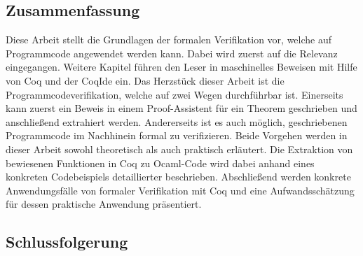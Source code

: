 \subsection{Zusammenfassung}
Diese Arbeit stellt die Grundlagen der formalen Verifikation vor, welche auf Programmcode angewendet werden kann. Dabei wird zuerst auf die Relevanz eingegangen. Weitere Kapitel führen den Leser in maschinelles Beweisen mit Hilfe von Coq und der CoqIde ein. Das Herzstück dieser Arbeit ist die Programmcodeverifikation, welche auf zwei Wegen durchführbar ist. Einerseits kann zuerst ein Beweis in einem Proof-Assistent für ein Theorem geschrieben und anschließend extrahiert werden. Andererseits ist es auch möglich, geschriebenen Programmcode im Nachhinein formal zu verifizieren. Beide Vorgehen werden in dieser Arbeit sowohl theoretisch als auch praktisch erläutert. Die Extraktion von bewiesenen Funktionen in Coq zu Ocaml-Code wird dabei anhand eines konkreten Codebeispiels detaillierter beschrieben. Abschließend werden konkrete Anwendungsfälle von formaler Verifikation mit Coq und eine Aufwandsschätzung für dessen praktische Anwendung präsentiert.

\subsection{Schlussfolgerung}

